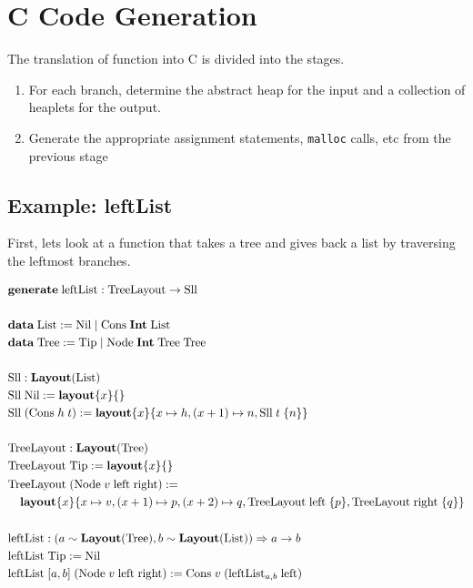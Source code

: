 \section{C Code Generation}

The translation of \PikaCore{} function into C is divided into the stages.

\begin{enumerate}
  \item \label{stage:in-out} For each branch, determine the abstract heap for the input and a collection of
    heaplets for the output.
  \item Generate the appropriate assignment statements, \verb|malloc| calls, etc from the
    previous stage
\end{enumerate}

\subsection{Example: leftList}
First, lets look at a \Pika{} function that takes a tree and gives back a list by traversing the leftmost branches.

$\begin{aligned}
  &\generate\; \textrm{leftList} : \textrm{TreeLayout} \ra \textrm{Sll}\\
  \\%
  &\data\; \textrm{List} := \textrm{Nil} \mid \textrm{Cons}\; \Int\; \textrm{List}\\
  &\data\; \textrm{Tree} := \textrm{Tip} \mid \textrm{Node}\; \Int\; \textrm{Tree}\; \textrm{Tree}\\
  \\%
  &\textrm{Sll} : \Layout{\textrm{List}}\\
  &\textrm{Sll}\; \textrm{Nil} := \ssl\{x\}\{\}\\
  &\textrm{Sll}\; (\textrm{Cons}\; h\; t) := \ssl\{x\}\{ x \mapsto h, (x+1) \mapsto n, \textrm{Sll}\; t\; \{n\} \}\\
  \\%
  &\textrm{TreeLayout} : \Layout{\textrm{Tree}}\\
  &\textrm{TreeLayout}\; \textrm{Tip} := \ssl\{x\}\{\}\\
  &\begin{aligned}
    \textrm{Tr}&\textrm{eeLayout}\; (\textrm{Node}\; v\; \textrm{left}\; \textrm{right}) :=\\
        &\ssl\{x\}\{ x \mapsto v, (x+1) \mapsto p, (x+2) \mapsto q, \textrm{TreeLayout}\; \textrm{left}\; \{p\}, \textrm{TreeLayout}\; \textrm{right}\; \{q\}\}
   \end{aligned}\\
  \\%
  &\textrm{leftList} : (a \isA \Layout{\textrm{Tree}}, b \isA \Layout{\textrm{List}}) \Ra a \ra b\\
  &\textrm{leftList}\; \textrm{Tip} := \textrm{Nil}\\
  &\textrm{leftList}\; [a, b]\; (\textrm{Node}\; v\; \textrm{left}\; \textrm{right}) :=
      \textrm{Cons}\; v\; (\textrm{leftList}_{a,b}\; \textrm{left})
\end{aligned}$
\\

